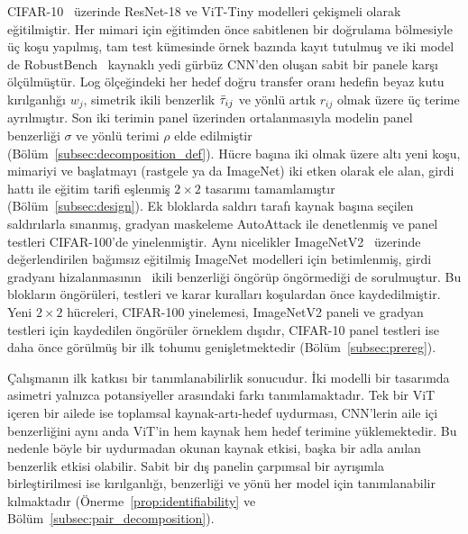 CIFAR-10~\cite{krizhevsky2009learning} üzerinde ResNet-18 ve ViT-Tiny modelleri çekişmeli olarak eğitilmiştir. Her mimari için eğitimden önce sabitlenen bir doğrulama bölmesiyle üç koşu yapılmış, tam test kümesinde örnek bazında kayıt tutulmuş ve iki model de RobustBench~\cite{croce2021robustbench} kaynaklı yedi gürbüz CNN'den oluşan sabit bir panele karşı ölçülmüştür. Log ölçeğindeki her hedef doğru transfer oranı hedefin beyaz kutu kırılganlığı $w_j$, simetrik ikili benzerlik $\bar{\tau}_{ij}$ ve yönlü artık $r_{ij}$ olmak üzere üç terime ayrılmıştır. Son iki terimin panel üzerinden ortalanmasıyla modelin panel benzerliği $\sigma$ ve yönlü terimi $\rho$ elde edilmiştir (Bölüm~\ref{subsec:decomposition_def}). Hücre başına iki olmak üzere altı yeni koşu, mimariyi ve başlatmayı (rastgele ya da ImageNet) iki etken olarak ele alan, girdi hattı ile eğitim tarifi eşlenmiş $2\times2$ tasarımı tamamlamıştır (Bölüm~\ref{subsec:design}). Ek bloklarda saldırı tarafı kaynak başına seçilen saldırılarla sınanmış, gradyan maskeleme AutoAttack ile denetlenmiş ve panel testleri CIFAR-100'de yinelenmiştir. Aynı nicelikler ImageNetV2~\cite{recht2019imagenet} üzerinde değerlendirilen bağımsız eğitilmiş ImageNet modelleri için betimlenmiş, girdi gradyanı hizalanmasının~\cite{zhang2024why} ikili benzerliği öngörüp öngörmediği de sorulmuştur. Bu blokların öngörüleri, testleri ve karar kuralları koşulardan önce kaydedilmiştir. Yeni $2\times2$ hücreleri, CIFAR-100 yinelemesi, ImageNetV2 paneli ve gradyan testleri için kaydedilen öngörüler örneklem dışıdır, CIFAR-10 panel testleri ise daha önce görülmüş bir ilk tohumu genişletmektedir (Bölüm~\ref{subsec:prereg}).

Çalışmanın ilk katkısı bir tanımlanabilirlik sonucudur. İki modelli bir tasarımda asimetri yalnızca potansiyeller arasındaki farkı tanımlamaktadır. Tek bir ViT içeren bir ailede ise toplamsal kaynak-artı-hedef uydurması, CNN'lerin aile içi benzerliğini aynı anda ViT'in hem kaynak hem hedef terimine yüklemektedir. Bu nedenle böyle bir uydurmadan okunan kaynak etkisi, başka bir adla anılan benzerlik etkisi olabilir. Sabit bir dış panelin çarpımsal bir ayrışımla birleştirilmesi ise kırılganlığı, benzerliği ve yönü her model için tanımlanabilir kılmaktadır (Önerme~\ref{prop:identifiability} ve Bölüm~\ref{subsec:pair_decomposition}).

